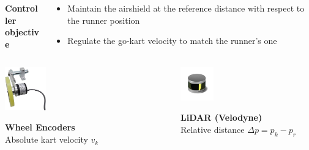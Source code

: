 \documentclass[9pt, aspectratio=169]{beamer}
\begin{document}
\begin{frame}[t]
\vspace{0.2cm}
\begin{columns}
\begin{column}{0.2\textwidth}
\begin{block}{}
\centering
\textcolor{emph@Thesis}{\textbf{\small{Controller \\ objective}}}
\end{block}
\end{column}
\begin{column}{0.8\textwidth}
\begin{block}{}
\begin{itemize}
	\footnotesize
	\item[$\blacktriangleright$]<3-> Maintain the airshield at the reference distance with respect to the runner position
	\item[$\blacktriangleright$]<4-> Regulate the go-kart velocity to match the runner's one
\end{itemize}
\end{block}
\end{column}
\end{columns}

\vspace{0.5cm}
\begin{columns}
\begin{column}{0.3\textwidth}
	\begin{center}
  		\includegraphics[width=0.25\textwidth]{Wheel_Encoder} 
	\end{center}
\centering
\textbf{Wheel Encoders} \\
Absolute kart velocity $v_k$
\end{column}

\begin{column}{0.3\textwidth}
	\begin{center}
  		\includegraphics[width=0.25\textwidth]{Lidar} 
	\end{center}
\centering
\textbf{LiDAR (Velodyne)} \\
Relative distance $\Delta p = p_k - p_r$
\end{column}


\end{columns}
\end{frame}
\end{document}
